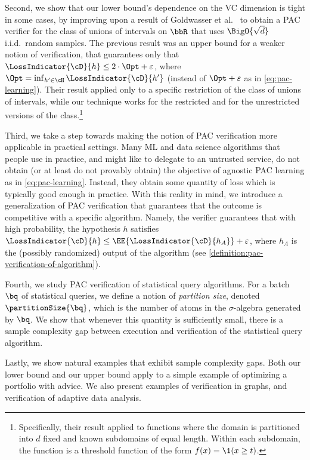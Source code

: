 Second, we show that our lower bound's dependence on the VC dimension is tight in some cases, by improving upon a result of Goldwasser et al.\ \cite{GoldwasserRSY21} to obtain a PAC verifier for the class of unions of intervals on $\bbR$ that uses $\BigO{\sqrt{d}}$ i.i.d.\ random samples. The previous result was an upper bound for a weaker notion of verification, that guarantees only that $\LossIndicator{\cD}{h} \leq 2\cdot \Opt + \varepsilon$, where $\Opt = \inf_{h' \in \cH} \LossIndicator{\cD}{h'}$ (instead of $\Opt + \varepsilon$ as in \cref{eq:pac-learning}). Their result applied only to a specific restriction of the class of unions of intervals, while our technique works for the restricted and for the unrestricted versions of the class.\footnote{%
	Specifically, their result applied to functions where the domain is partitioned into $d$ fixed and known subdomains of equal length. Within each subdomain, the function is a threshold function of the form $f(x) = \1(x \geq t)$.%
}

Third, we take a step towards making the notion of PAC verification more applicable in practical settings. Many ML and data science algorithms that people use in practice, and might like to delegate to an untrusted service, do not obtain (or at least do not provably obtain) the objective of agnostic PAC learning as in \cref{eq:pac-learning}. Instead, they obtain some quantity of loss which is typically good enough in practice. With this reality in mind, we introduce a generalization of PAC verification that guarantees that the outcome is competitive with a specific algorithm. Namely, the verifier guarantees that with high probability, the hypothesis $h$ satisfies $\LossIndicator{\cD}{h} \leq \EE{\LossIndicator{\cD}{h_A}} + \varepsilon$, where $h_A$ is the (possibly randomized) output of the algorithm (see \cref{definition:pac-verification-of-algorithm}).

Fourth, we study PAC verification of statistical query algorithms. For a batch $\bq$ of statistical queries, we define a notion of \emph{partition size}, denoted $\partitionSize{\bq}$, which is the number of atoms in the $\sigma$-algebra generated by $\bq$. We show that whenever this quantity is sufficiently small, there is a sample complexity gap between execution and verification of the statistical query algorithm. 

Lastly, we show natural examples that exhibit sample complexity gaps. Both our lower bound and our upper bound apply to a simple example of optimizing a portfolio with advice. We also present examples of verification in graphs, and verification of adaptive data analysis. 


